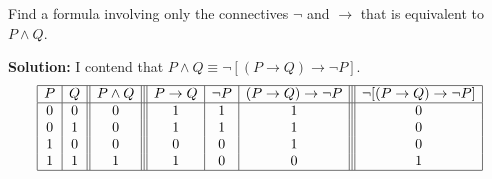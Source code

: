 Find a formula involving only the connectives $\neg$ and $\rightarrow$ that is equivalent to $P \wedge Q$.

\textbf{Solution:} I contend that $P \wedge Q \equiv \neg [(P \rightarrow Q) \rightarrow \neg P]$.
    \[
    \begin{array}{|c|c||c|||c|c|c|||c|}
    \hline
    P & Q & P \wedge Q & P \rightarrow Q & \neg P & (P \rightarrow Q) \rightarrow \neg P & \neg [(P \rightarrow Q) \rightarrow \neg P]\\
    \hline
    0 & 0 & 0 & 1 & 1 & 1 & 0\\
    0 & 1 & 0 & 1 & 1 & 1 & 0\\
    1 & 0 & 0 & 0 & 0 & 1 & 0\\
    1 & 1 & 1 & 1 & 0 & 0 & 1\\
    \hline
    \end{array}
    \]


\pagebreak